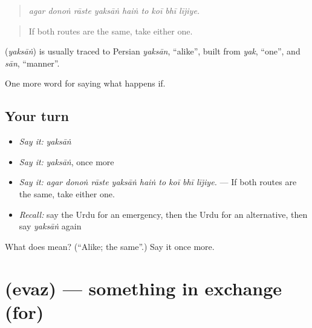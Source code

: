 \begin{quote}
        
\end{quote}

\begin{quote}
\emph{agar donoṅ rāste yaksāṅ haiṅ to koī bhī lījiye.}
\end{quote}

\begin{quote}
If both routes are the same, take either one.
\end{quote}

\begin{cousinweb}
\textbf{} (\emph{yaksāṅ}) is usually traced to Persian \emph{yaksān}, \textquotedblleft{}alike\textquotedblright{}, built from \emph{yak}, \textquotedblleft{}one\textquotedblright{}, and \emph{sān}, \textquotedblleft{}manner\textquotedblright{}.
\end{cousinweb}

\begin{grammarlens}[title={What you've built}]
One more word for saying what happens if.
\end{grammarlens}

\subsection*{Your turn}
\begin{itemize}
\raggedright
  \item \emph{Say it:} \emph{yaksāṅ}
  \item \emph{Say it:} \emph{yaksāṅ}, once more
  \item \emph{Say it:} \emph{agar donoṅ rāste yaksāṅ haiṅ to koī bhī lījiye.} — If both routes are the same, take either one.
  \item \emph{Recall:} say the Urdu for an emergency, then the Urdu for an alternative, then say \emph{yaksāṅ} again
\end{itemize}

\begin{tcolorbox}[breakable,colback=teal!4,colframe=teal!35!black,title={Before you move on}]
What does  mean? (\textquotedblleft{}Alike; the same\textquotedblright{}.) Say it once more.
\end{tcolorbox}
\section[\texorpdfstring{\ur{عوض} (evaz)}{عوض (evaz)}]{ (evaz) — something in exchange (for)}

